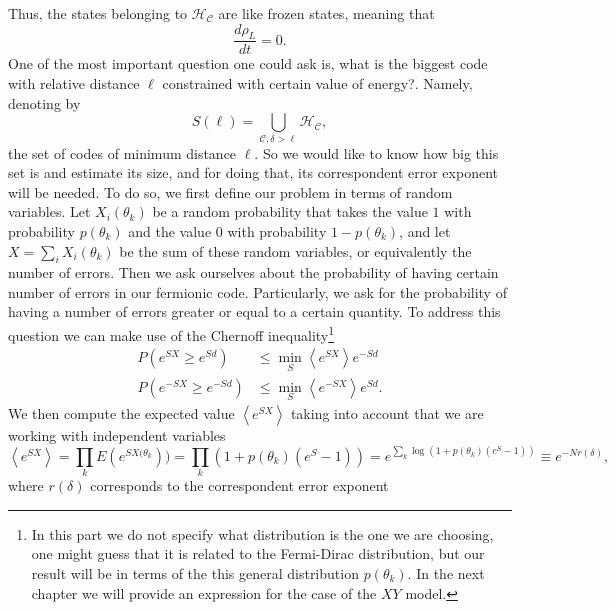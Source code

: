 \indent Thus, the states belonging to $ \mathcal{H}_{\mathcal{C}}$ are like frozen states, meaning that
\begin{equation}
\frac{d\rho_L}{dt}=0.
\end{equation}
\indent One of the most important question one could ask is, what is the biggest code with relative distance $\ell$ constrained with certain value of energy?. Namely, denoting by
\begin{equation}
S(\ell) = \bigcup_{\mathcal{C}, \delta>\ell}\mathcal{H}_{\mathcal{C}},
\end{equation} 
the set of codes of minimum distance $\ell$. So we would like to know how big this set is and estimate its size, and for doing that, its correspondent error exponent will be needed. To do so, we first define our problem in terms of random variables. Let $X_i(\theta_k)$ be a random probability that takes the value $1$ with probability $p(\theta_k)$ and the value $0$ with probability $1-p(\theta_k)$, and let $X=\sum_{i}X_i(\theta_k)$ be the sum of these random variables, or equivalently the number of errors. Then we ask ourselves about the probability of having certain number of errors in our fermionic code. Particularly, we ask for the probability of having a number of errors greater or equal to a certain quantity. To address this question we can make use of the Chernoff inequality\footnote{In this part we do not specify what distribution is the one we are choosing, one might guess that it is related to the Fermi-Dirac distribution, but our result will be in terms of the this general distribution $p(\theta_k)$. In the next chapter we will provide an expression for the case of the $XY$ model.} 
\begin{equation}
\begin{aligned}
P(e^{S X}\geq e^{S d})&\leq \min_{S}\left\langle e^{S X}\right\rangle e^{-S d}\\
P(e^{-S X}\geq e^{-S d})&\leq \min_{S}\left\langle e^{-S X}\right\rangle e^{S d}.
\end{aligned}
\end{equation}
\indent We then compute the expected value $\left\langle e^{S X}\right\rangle$ taking into account that we are working with independent variables
\begin{equation}
\left\langle e^{S X}\right\rangle = \prod_{k}  E(e^{S X(\theta_k})) = \prod_k \left(1+p(\theta_k)(e^S -1)\right) = e^{\sum_{k}\log(1+p(\theta_k)(e^S -1))}\equiv e^{-Nr(\delta)},
\end{equation}
where $r(\delta)$ corresponds to the correspondent error exponent
